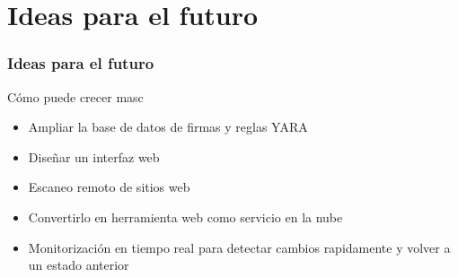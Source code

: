 \documentclass[xcolor={dvipsnames}]{beamer}
\begin{document}
\section{Ideas para el futuro}

\begin{frame}\frametitle{Ideas para el futuro}
    \begin{block}{Cómo puede crecer masc}
    \begin{itemize}
        \item Ampliar la base de datos de firmas y reglas YARA
        \item Diseñar un interfaz web
        \item Escaneo remoto de sitios web
        \item Convertirlo en herramienta web como servicio en la nube
        \item Monitorización en tiempo real para detectar cambios rapidamente y volver a un estado anterior
    \end{itemize}
    \end{block}
\end{frame}
\end{document}
